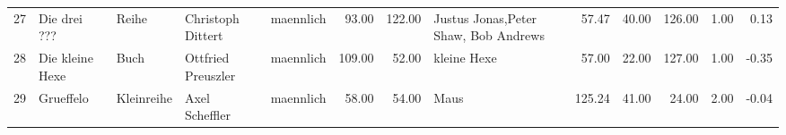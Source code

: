 \begin{sidewaystable}[ht]
\begin{center}
{\begin{tabular}{rllllrrlrrrrr}
  27 & Die drei ???                                                                                                                                                                                                                                                    & Reihe & Christoph Dittert                                                                                                                                                                                                                                               & maennlich & 93.00 & 122.00 & Justus Jonas,Peter Shaw, Bob Andrews                                                                                                                                                                                                                            & 57.47 & 40.00 & 126.00 & 1.00 & 0.13 \\ 
  28 & Die kleine Hexe                                                                                                                                                                                                                                                 & Buch & Ottfried Preuszler                                                                                                                                                                                                                                              & maennlich & 109.00 & 52.00 & kleine Hexe                                                                                                                                                                                                                                                     & 57.00 & 22.00 & 127.00 & 1.00 & -0.35 \\ 
  29 & Grueffelo                                                                                                                                                                                                                                                       & Kleinreihe & Axel Scheffler                                                                                                                                                                                                                                                  & maennlich & 58.00 & 54.00 & Maus                                                                                                                                                                                                                                                            & 125.24 & 41.00 & 24.00 & 2.00 & -0.04 \\ 

\end{tabular}}
\end{center}
\end{sidewaystable}

